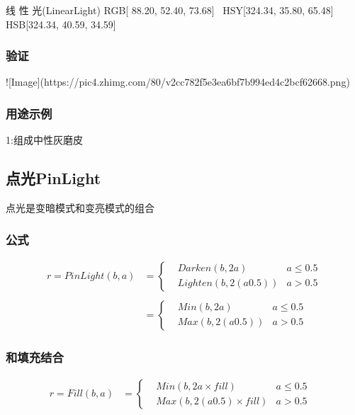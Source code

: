 线 性 光(LinearLight)   RGB[ 88.20,  52.40,  73.68]~ HSY[324.34,  35.80,  65.48]~ HSB[324.34,  40.59,  34.59]


\subsubsection{ 验证}

![Image](https://pic4.zhimg.com/80/v2cc782f5e3ea6bf7b994ed4c2bcf62668.png)

\subsubsection{ 用途示例}

1:组成中性灰磨皮

\subsection{ 点光PinLight}

点光是变暗模式和变亮模式的组合

\subsubsection{ 公式}

$$\begin{aligned}r=PinLight(b,a)&=\left\{ \begin{aligned}&Darken(b,2a)&a\leq 0.5\\&Lighten(b,2(a0.5))&a> 0.5  \end{aligned}\right.\\&\\&=\left\{ \begin{aligned}&Min(b,2a)&a\leq 0.5\\&Max(b,2(a0.5))&a> 0.5  \end{aligned}\right.\end{aligned}$$

\subsubsection{ 和填充结合}

$$\begin{aligned}r= Fill(b,a)&=\left\{ \begin{aligned}&Min(b,2a\times fill)&a\leq 0.5\\&Max(b,2(a0.5)\times fill)&a> 0.5  \end{aligned}\right.&\end{aligned}$$


